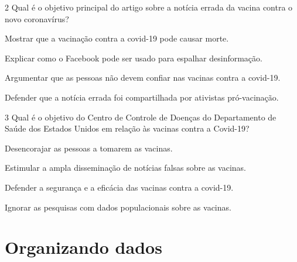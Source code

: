 \num{2} Qual é o objetivo principal do artigo sobre a notícia errada da vacina
contra o novo coronavírus?

\begin{escolha}
\item Mostrar que a vacinação contra a covid-19 pode causar morte.

\item Explicar como o Facebook pode ser usado para espalhar desinformação.

\item Argumentar que as pessoas não devem confiar nas vacinas contra a covid-19.

\item Defender que a notícia errada foi compartilhada por ativistas pró-vacinação.
\end{escolha}


\pagebreak
\num{3} Qual é o objetivo do Centro de Controle de Doenças do Departamento de Saúde dos Estados
Unidos em relação às vacinas contra a Covid-19?

\begin{escolha}
\item Desencorajar as pessoas a tomarem as vacinas.

\item Estimular a ampla disseminação de notícias falsas sobre as vacinas.

\item Defender a segurança e a eficácia das vacinas contra a covid-19.

\item Ignorar as pesquisas com dados populacionais sobre as vacinas.
\end{escolha}


\chapter{Organizando dados}

\vspace*{-2\baselineskip}

